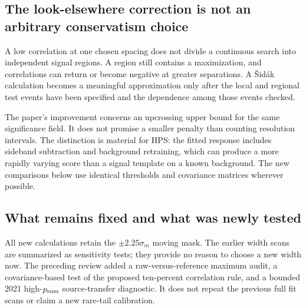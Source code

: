 \subsection{The look-elsewhere correction is not an arbitrary conservatism choice}
A low correlation at one chosen spacing does not divide a continuous search into independent signal regions. A region still contains a maximization, and correlations can return or become negative at greater separations. A \v{S}id\'{a}k calculation becomes a meaningful approximation only after the local and regional test events have been specified and the dependence among those events checked.

The paper's improvement concerns an upcrossing upper bound for the same significance field\cite{AnanievRead}. It does not promise a smaller penalty than counting resolution intervals. The distinction is material for HPS: the fitted response includes sideband subtraction and background retraining, which can produce a more rapidly varying score than a signal template on a known background. The new comparisons below use identical thresholds and covariance matrices wherever possible.

\subsection{What remains fixed and what was newly tested}
All new calculations retain the $\pm2.25\sigma_m$ moving mask. The earlier width scans are summarized as sensitivity tests; they provide no reason to choose a new width now. The preceding review added a raw-versus-reference maximum audit, a covariance-based test of the proposed ten-percent correlation rule, and a bounded 2021 high-$p_{\rm sum}$ source-transfer diagnostic. It does not repeat the previous full fit scans or claim a new rare-tail calibration.
